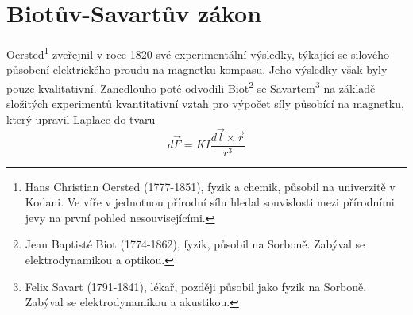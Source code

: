   \section{Biotův-Savartův zákon}\label{ES:sec10}
    Oersted\footnote{Hans Christian Oersted (1777-1851), fyzik a chemik, působil na univerzitě v 
    Kodani. Ve víře v jednotnou přírodní sílu hledal souvislosti mezi přírodními jevy na první 
    pohled nesouvisejícími.} zveřejnil v roce 1820 své experimentální výsledky, týkající se 
    silového působení elektrického proudu na magnetku kompasu. Jeho výsledky však byly pouze 
    kvalitativní. Zanedlouho poté odvodili Biot\footnote{Jean Baptisté Biot (1774-1862), fyzik, 
    působil na Sorboně. Zabýval se elektrodynamikou a optikou.} se Savartem\footnote{Felix Savart 
    (1791-1841), lékař, později působil jako fyzik na Sorboně. Zabýval se elektrodynamikou a 
    akustikou.} na základě složitých experimentů kvantitativní vztah pro výpočet síly působící na 
    magnetku, který upravil Laplace do tvaru
    \begin{equation}\label{ES:eq_zakl_elm63}
      d\vec{F} = KI\frac{d\vec{l}\times \vec{r}}{r^3}
    \end{equation} 
    
